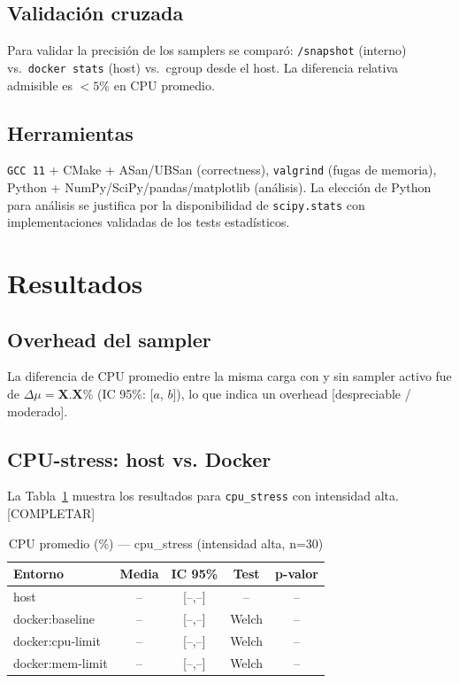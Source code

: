 \documentclass[conference]{IEEEtran}
\begin{document}
\subsection{Validación cruzada}

Para validar la precisión de los samplers se comparó:
\texttt{/snapshot} (interno) vs.\ \texttt{docker stats} (host) vs.\ cgroup
desde el host. La diferencia relativa admisible es $< 5\%$ en CPU promedio.

\subsection{Herramientas}

\texttt{GCC 11} + CMake + ASan/UBSan (correctness), \texttt{valgrind}
(fugas de memoria), Python + NumPy/SciPy/pandas/matplotlib (análisis).
La elección de Python para análisis se justifica por la disponibilidad de
\texttt{scipy.stats} con implementaciones validadas de los tests estadísticos.

\section{Resultados}


\subsection{Overhead del sampler}

La diferencia de CPU promedio entre la misma carga con y sin sampler activo
fue de $\Delta\mu = \mathbf{X.X\%}$ (IC 95\%: [$a$, $b$]), lo que indica
un overhead [despreciable / moderado].

\subsection{CPU-stress: host vs. Docker}

La Tabla~\ref{tab:cpu} muestra los resultados para \texttt{cpu\_stress}
con intensidad alta. [COMPLETAR]

\begin{table}[h]
  \centering
  \caption{CPU promedio (\%) — cpu\_stress (intensidad alta, n=30)}
  \label{tab:cpu}
  \begin{tabular}{lcccc}
    \toprule
    Entorno & Media & IC 95\% & Test & p-valor \\
    \midrule
    host           & -- & [--,--] & -- & -- \\
    docker:baseline & -- & [--,--] & Welch & -- \\
    docker:cpu-limit & -- & [--,--] & Welch & -- \\
    docker:mem-limit & -- & [--,--] & Welch & -- \\
    \bottomrule
  \end{tabular}
\end{table}
\end{document}
